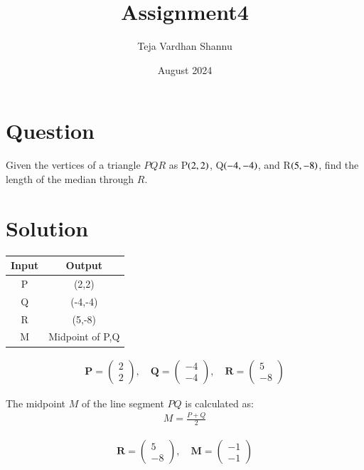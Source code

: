 \documentclass[journal]{IEEEtran}
\title{Assignment4}
\author{Teja Vardhan Shannu}
\date{August 2024}
\numberwithin{equation}{enumi}
\numberwithin{figure}{enumi}
\begin{document}
\maketitle

\section*{Question}
Given the vertices of a triangle \( PQR \) as P$\left(2,2\right)$, Q$\left(-4,-4\right)$, and R$\left(5,-8\right)$, find the length of the median through \( R \).

\section*{Solution}


\begin{table}[h!]
\centering    

\begin{tabular}{|c|c|}
\hline

Input & Output \\
\hline
P & (2,2) \\
Q & (-4,-4) \\
R & (5,-8)\\
M & Midpoint of P,Q    \\

\hline
\end{tabular}
\end{table}


\begin{align}
\mathbf{P} = \begin{pmatrix} 2 \\ 2 \end{pmatrix}, \quad \mathbf{Q} = \begin{pmatrix} -4 \\ -4 \end{pmatrix}, \quad \mathbf{R} = \begin{pmatrix} 5 \\ -8 
\end{pmatrix}
\end{align}




The midpoint \( M \) of the line segment \( PQ \) is calculated as:
\begin{align}
M =  \frac{P + Q}{2}
\end{align}






\begin{align}
\mathbf{R} = \begin{pmatrix} 5 \\ -8 \end{pmatrix}, \quad \mathbf{M} = \begin{pmatrix} -1 \\ -1 \end{pmatrix}
\end{align}
\end{document}
